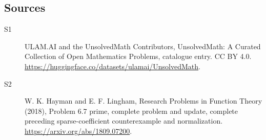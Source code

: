 \documentclass[11pt]{article}
\begin{document}
\subsection{Sources}
\begin{description}
\item[\hypertarget{source:statement:1}{S1}] ULAM.AI and the UnsolvedMath Contributors, UnsolvedMath: A Curated Collection of Open Mathematics Problems, catalogue entry. CC BY 4.0. \url{https://huggingface.co/datasets/ulamai/UnsolvedMath}.
\item[\hypertarget{source:statement:2}{S2}] W. K. Hayman and E. F. Lingham, Research Problems in Function Theory (2018), Problem 6.7 prime, complete problem and update, complete preceding sparse-coefficient counterexample and normalization. \url{https://arxiv.org/abs/1809.07200}.
\end{description}
\label{end:statement}
\end{document}
